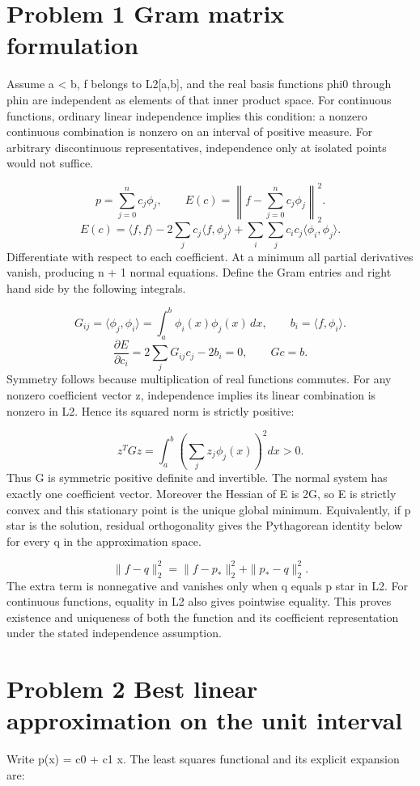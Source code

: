 \documentclass[a4paper,11pt]{article}
\begin{document}
\section*{Problem 1 Gram matrix formulation}
Assume a < b, f belongs to L2[a,b], and the real basis functions phi0 through phin are independent as elements of that inner product space. For continuous functions, ordinary linear independence implies this condition: a nonzero continuous combination is nonzero on an interval of positive measure. For arbitrary discontinuous representatives, independence only at isolated points would not suffice.

\[p=\sum_{j=0}^{n}c_j\phi_j,\qquad E(c)=\left\|f-\sum_{j=0}^{n}c_j\phi_j\right\|_2^2.\]
\[E(c)=\langle f,f\rangle-2\sum_jc_j\langle f,\phi_j\rangle+\sum_i\sum_jc_ic_j\langle\phi_i,\phi_j\rangle.\]
Differentiate with respect to each coefficient. At a minimum all partial derivatives vanish, producing n + 1 normal equations. Define the Gram entries and right hand side by the following integrals.

\[G_{ij}=\langle\phi_j,\phi_i\rangle=\int_a^b\phi_i(x)\phi_j(x)\,dx,\qquad b_i=\langle f,\phi_i\rangle.\]
\[\frac{\partial E}{\partial c_i}=2\sum_jG_{ij}c_j-2b_i=0,\qquad Gc=b.\]
Symmetry follows because multiplication of real functions commutes. For any nonzero coefficient vector z, independence implies its linear combination is nonzero in L2. Hence its squared norm is strictly positive:

\[z^TGz=\int_a^b\left(\sum_jz_j\phi_j(x)\right)^2dx>0.\]
Thus G is symmetric positive definite and invertible. The normal system has exactly one coefficient vector. Moreover the Hessian of E is 2G, so E is strictly convex and this stationary point is the unique global minimum. Equivalently, if p star is the solution, residual orthogonality gives the Pythagorean identity below for every q in the approximation space.

\[\|f-q\|_2^2=\|f-p_*\|_2^2+\|p_*-q\|_2^2.\]
The extra term is nonnegative and vanishes only when q equals p star in L2. For continuous functions, equality in L2 also gives pointwise equality. This proves existence and uniqueness of both the function and its coefficient representation under the stated independence assumption.

\clearpage
\section*{Problem 2 Best linear approximation on the unit interval}
Write p(x) = c0 + c1 x. The least squares functional and its explicit expansion are:
\end{document}
